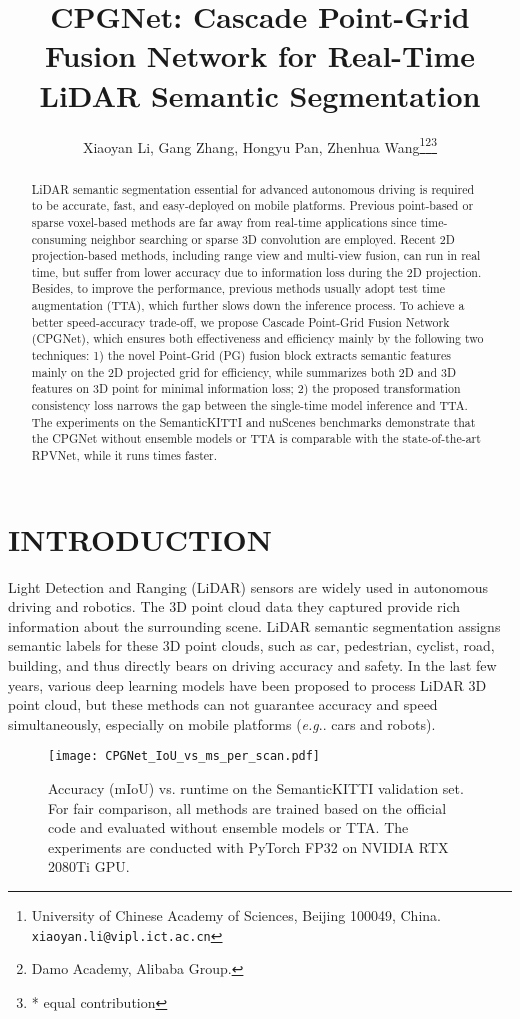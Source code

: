 \documentclass[letterpaper, 10 pt, conference]{ieeeconf}
\title{\LARGE \bf CPGNet: Cascade Point-Grid Fusion Network for Real-Time LiDAR Semantic Segmentation}
\author{Xiaoyan Li, Gang Zhang, Hongyu Pan, Zhenhua Wang\thanks{University of Chinese Academy of Sciences, Beijing 100049, China.
{\tt\small xiaoyan.li@vipl.ict.ac.cn}}\thanks{Damo Academy, Alibaba Group.
\newline {\tt\small zhanggang11021136@gmail.com}
\newline {\tt\small hongyu.pan@alibaba-inc.com}
\newline {\tt\small zhwang.me@gmail.com}}\thanks{* equal contribution}
}
\makeatletter
\DeclareRobustCommand\onedot{\futurelet\@let@token\@onedot}
\def\@onedot{\ifx\@let@token.\else.\null\fi\xspace}
\def\eg{\emph{e.g}\onedot} \def\Eg{\emph{E.g}\onedot}
\makeatother
\begin{document}
\maketitle
\thispagestyle{empty}
\pagestyle{empty}


\begin{abstract}
LiDAR semantic segmentation essential for advanced autonomous driving is required to be accurate,
fast, and easy-deployed on mobile platforms. Previous point-based or sparse voxel-based methods are far away from
real-time applications since time-consuming neighbor searching or sparse 3D convolution are employed. Recent 2D projection-based methods,
including range view and multi-view fusion, can run in real
time, but suffer from lower accuracy due to information loss during the 2D projection. Besides, to improve the performance, previous methods usually adopt test time augmentation (TTA), which further slows down the inference process. To achieve a better speed-accuracy trade-off, we propose Cascade Point-Grid Fusion Network (CPGNet), which ensures both effectiveness and efficiency mainly by the following two techniques: 1) the novel Point-Grid (PG) fusion block extracts semantic features mainly on the 2D projected grid for efficiency, while summarizes both 2D and 3D features on 3D point for minimal information loss; 2) the proposed transformation consistency loss narrows the gap between the single-time model inference and TTA. The experiments on the SemanticKITTI and nuScenes benchmarks demonstrate that the CPGNet without ensemble models or TTA is comparable with the state-of-the-art RPVNet, while it runs  times faster.
\end{abstract}


\section{INTRODUCTION}
Light Detection and Ranging (LiDAR) sensors are widely used in autonomous driving and robotics. The 3D point cloud data they captured provide rich information about the surrounding scene. LiDAR semantic segmentation assigns semantic labels for these 3D point clouds, such as car, pedestrian, cyclist, road, building, and thus directly bears on driving accuracy and safety. In the last few years, various deep learning models have been proposed to process LiDAR 3D point cloud, but these methods can not guarantee accuracy and speed simultaneously, especially on mobile platforms (\eg cars and robots).

\begin{figure}[t]
\centering
\texttt{[image: CPGNet\_IoU\_vs\_ms\_per\_scan.pdf]}
\caption{Accuracy (mIoU) vs. runtime on the SemanticKITTI validation set. For fair comparison, all methods are trained based on the official code and evaluated without ensemble models or TTA. The experiments are conducted with PyTorch FP32 on NVIDIA RTX 2080Ti GPU.}
\label{Fig_iou_vs_speed}
\end{figure}
\end{document}
